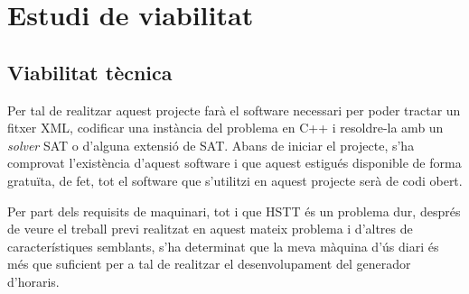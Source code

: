 \documentclass[11pt,a4paper,twoside]{report}
\begin{document}
  \chapter{Estudi de viabilitat}

  \section{Viabilitat tècnica}

  Per tal de realitzar aquest projecte farà el software necessari per poder tractar un fitxer XML, codificar una instància del problema en C++ i resoldre-la amb un \textit{solver} SAT o d'alguna extensió de SAT. 
  Abans de iniciar el projecte, s'ha comprovat l'existència d'aquest software i que aquest estigués disponible de forma gratuïta, de fet, tot el software que s'utilitzi en aquest projecte serà de codi obert.

  Per part dels requisits de maquinari, tot i que HSTT és un problema dur, 
  després de veure el treball previ realitzat en aquest mateix problema i d'altres de característiques semblants, s'ha determinat que la meva màquina d'ús diari és més que suficient per a tal de realitzar el desenvolupament del generador d'horaris.
\end{document}
